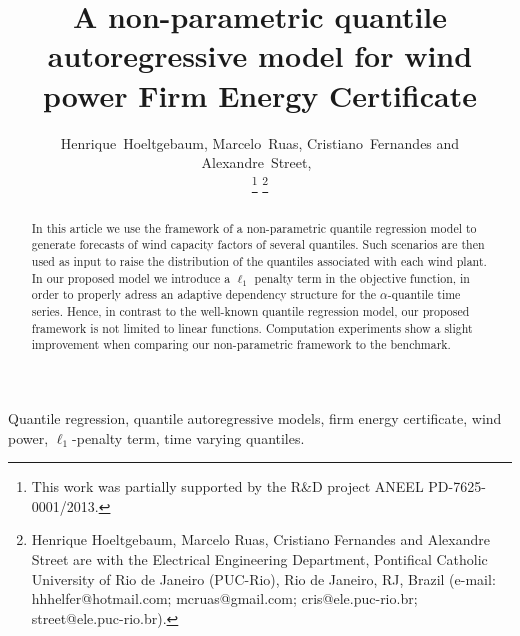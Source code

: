 \documentclass[a4paper]{IEEEtran}
\begin{document}
\title{A non-parametric quantile autoregressive model for wind power Firm Energy Certificate}

\author{Henrique~Hoeltgebaum,
		Marcelo~Ruas,
		Cristiano~Fernandes
	    and Alexandre~Street,~

\thanks{This work was partially supported by the R\&D project ANEEL PD-7625-0001/2013.}
\thanks{Henrique Hoeltgebaum, Marcelo Ruas, Cristiano Fernandes and Alexandre Street are with the Electrical Engineering Department, Pontifical Catholic University of Rio de Janeiro (PUC-Rio), Rio de Janeiro, RJ, Brazil (e-mail: \mbox{hhhelfer@hotmail.com}; \mbox{mcruas@gmail.com}; \mbox{cris@ele.puc-rio.br}; \mbox{street@ele.puc-rio.br}).}
}

\maketitle
\begin{abstract}
	In this article we use the framework of a non-parametric quantile regression model to generate forecasts of wind capacity factors of several quantiles. Such scenarios are then used as input to raise the distribution of the quantiles associated with each wind plant. In our proposed model we introduce a $\ell_{1}$ penalty term in the objective function, in order to properly adress an adaptive dependency structure for the $\alpha$-quantile time series. Hence, in contrast to the well-known quantile regression model, our proposed framework is not limited to linear functions. Computation experiments show a slight improvement when comparing our non-parametric framework to the benchmark.
		


\end{abstract}

\begin{IEEEkeywords}
	Quantile regression, quantile autoregressive models, firm energy certificate, wind power, $\ell_{1}$-penalty term, time varying quantiles.
\end{IEEEkeywords}
\end{document}
